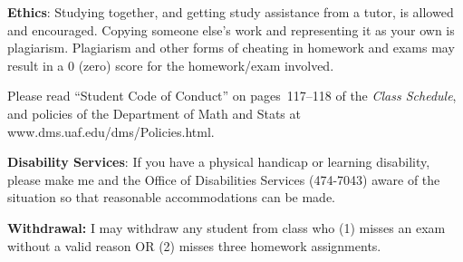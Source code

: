 \documentclass{article}
\begin{document}
\bigskip
\textbf{\large Ethics}:
Studying together, and getting study assistance from a tutor, is allowed
and encouraged. Copying someone else's work and representing it as your
own is plagiarism. Plagiarism and other forms of cheating in homework
and exams may result in a 0 (zero) score for the homework/exam
involved.

Please read ``Student Code of Conduct'' on pages~117--118 of the
\emph{Class Schedule}, and policies of the Department of Math and Stats
at www.dms.uaf.edu/dms/Policies.html.


\bigskip
\textbf{\large Disability Services}:
If you have a physical handicap or learning disability, please make me
and the Office of Disabilities Services (474-7043) aware of the
situation so that reasonable accommodations can be made.


\bigskip
\textbf{\large Withdrawal:}
I may withdraw any student from class who
(1) misses an exam without a valid reason OR
(2) misses three homework assignments.
\end{document}

